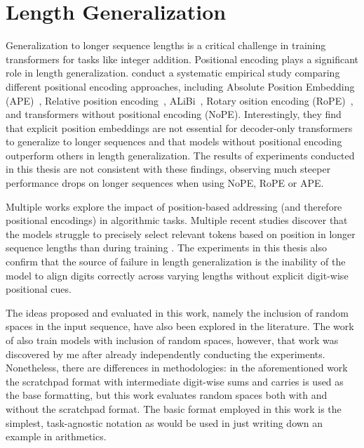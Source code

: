 \section{Length Generalization}\label{sec:sota_length_generalization}

Generalization to longer sequence lengths is a critical challenge in training transformers for tasks like integer addition. Positional encoding plays a significant role in length generalization. \cite{kazemnejad_impact_2023} conduct a systematic empirical study comparing different positional encoding approaches, including Absolute Position Embedding (APE)~\parencite{vaswani_attention_2017}, Relative position encoding~\parencite{shaw_self-attention_2018}, ALiBi~\parencite{press_train_2021}, Rotary osition encoding (RoPE)~\parencite{su_roformer_2024}, and transformers without positional encoding (NoPE). Interestingly, they find that explicit position embeddings are not essential for decoder-only transformers to generalize to longer sequences and that models without positional encoding outperform others in length generalization. The results of experiments conducted in this thesis are not consistent with these findings, observing much steeper performance drops on longer sequences when using NoPE, RoPE or APE.

Multiple works explore the impact of position-based addressing (and therefore positional encodings) in algorithmic tasks. Multiple recent studies discover that the models struggle to precisely select relevant tokens based on position in longer sequence lengths than during training \parencite{ebrahimi_your_2024,shen_positional_2023,zhao_length_2024,zhou_what_2023,yehudai_when_2024}. The experiments in this thesis also confirm that the source of failure in length generalization is the inability of the model to align digits correctly across varying lengths without explicit digit-wise positional cues.

The ideas proposed and evaluated in this work, namely the inclusion of random spaces in the input sequence, have also been explored in the literature. The work of \cite{shen_positional_2023} also train models with inclusion of random spaces, however, that work was discovered by me after already independently conducting the experiments. Nonetheless, there are differences in methodologies: in the aforementioned work the scratchpad format with intermediate digit-wise sums and carries is used as the base formatting, but this work evaluates random spaces both with and without the scratchpad format. The basic format employed in this work is the simplest, task-agnostic notation as would be used in just writing down an example in arithmetics.

